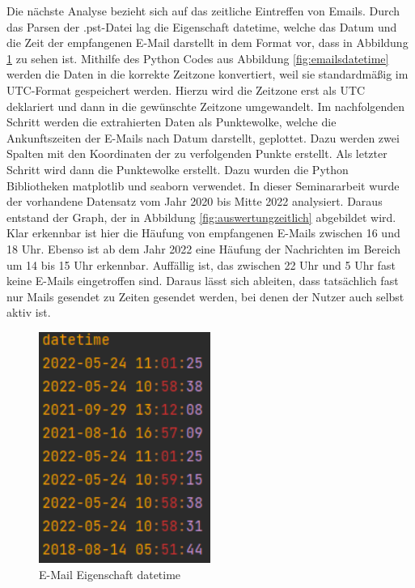 Die nächste Analyse bezieht sich auf das zeitliche Eintreffen von Emails. Durch das Parsen der .pst-Datei lag die Eigenschaft \glqq{}datetime\grqq, welche das Datum und die Zeit der empfangenen E-Mail darstellt in dem Format vor, dass in Abbildung \ref{fig:datetime} zu sehen ist. Mithilfe des Python Codes aus Abbildung \ref{fig:emailsdatetime} werden die Daten in die korrekte Zeitzone konvertiert, weil sie standardmäßig im UTC-Format gespeichert werden. Hierzu wird die Zeitzone erst als UTC deklariert und dann in die gewünschte Zeitzone umgewandelt. Im nachfolgenden Schritt werden die extrahierten Daten als Punktewolke, welche die Ankunftszeiten der E-Mails nach Datum darstellt, geplottet. Dazu werden zwei Spalten mit den Koordinaten der zu verfolgenden Punkte erstellt. Als letzter Schritt wird dann die Punktewolke erstellt. Dazu wurden die Python Bibliotheken \glqq{}matplotlib\grqq{} und \glqq{}seaborn\grqq{} verwendet. In dieser Seminararbeit wurde der vorhandene Datensatz vom Jahr 2020 bis Mitte 2022 analysiert. Daraus entstand der Graph, der in Abbildung \ref{fig:auswertungzeitlich} abgebildet wird. Klar erkennbar ist hier die Häufung von empfangenen E-Mails zwischen 16 und 18 Uhr. Ebenso ist ab dem Jahr 2022 eine Häufung der Nachrichten im Bereich um 14 bis 15 Uhr erkennbar. Auffällig ist, das zwischen 22 Uhr und 5 Uhr fast keine E-Mails eingetroffen sind. Daraus lässt sich ableiten, dass tatsächlich fast nur Mails gesendet zu Zeiten gesendet werden, bei denen der Nutzer auch selbst aktiv ist.

\begin{figure}
    \centering
    \includegraphics[width=0.50\textwidth]{images/datetime.PNG}
    \caption{E-Mail Eigenschaft datetime} 
    \label{fig:datetime}
\end{figure}

